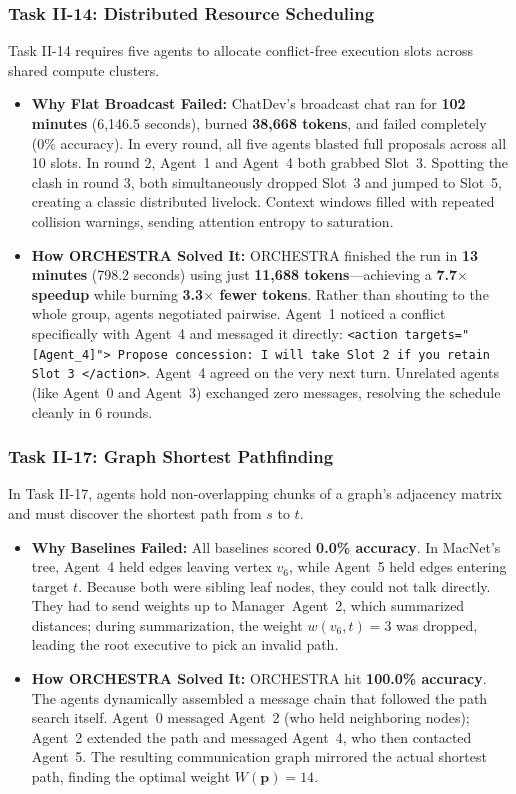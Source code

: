 \documentclass{ieeeaccess}
\begin{document}
\subsubsection{Task II-14: Distributed Resource Scheduling}
Task II-14 requires five agents to allocate conflict-free execution slots across shared compute clusters.
\begin{itemize}
    \item \textbf{Why Flat Broadcast Failed:} ChatDev's broadcast chat ran for \textbf{102 minutes} (6,146.5 seconds), burned \textbf{38,668 tokens}, and failed completely (0\% accuracy). In every round, all five agents blasted full proposals across all 10 slots. In round 2, Agent~1 and Agent~4 both grabbed Slot~3. Spotting the clash in round 3, both simultaneously dropped Slot~3 and jumped to Slot~5, creating a classic distributed livelock. Context windows filled with repeated collision warnings, sending attention entropy to saturation.
    \item \textbf{How ORCHESTRA Solved It:} ORCHESTRA finished the run in \textbf{13 minutes} (798.2 seconds) using just \textbf{11,688 tokens}---achieving a \textbf{7.7$\times$ speedup} while burning \textbf{3.3$\times$ fewer tokens}. Rather than shouting to the whole group, agents negotiated pairwise. Agent~1 noticed a conflict specifically with Agent~4 and messaged it directly: \texttt{\small <action targets="[Agent\_4]"> Propose concession: I will take Slot 2 if you retain Slot 3 </action>}. Agent~4 agreed on the very next turn. Unrelated agents (like Agent~0 and Agent~3) exchanged zero messages, resolving the schedule cleanly in 6 rounds.
\end{itemize}

\subsubsection{Task II-17: Graph Shortest Pathfinding}
In Task II-17, agents hold non-overlapping chunks of a graph's adjacency matrix and must discover the shortest path from $s$ to $t$.
\begin{itemize}
    \item \textbf{Why Baselines Failed:} All baselines scored \textbf{0.0\% accuracy}. In MacNet's tree, Agent~4 held edges leaving vertex $v_6$, while Agent~5 held edges entering target $t$. Because both were sibling leaf nodes, they could not talk directly. They had to send weights up to Manager~Agent~2, which summarized distances; during summarization, the weight $w(v_6, t)=3$ was dropped, leading the root executive to pick an invalid path.
    \item \textbf{How ORCHESTRA Solved It:} ORCHESTRA hit \textbf{100.0\% accuracy}. The agents dynamically assembled a message chain that followed the path search itself. Agent~0 messaged Agent~2 (who held neighboring nodes); Agent~2 extended the path and messaged Agent~4, who then contacted Agent~5. The resulting communication graph mirrored the actual shortest path, finding the optimal weight $W(\mathbf{p}) = 14$.
\end{itemize}
\end{document}

